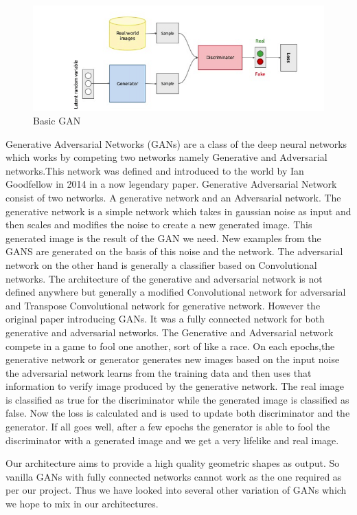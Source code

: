 \documentclass{article}
\begin{document}
\begin{figure}[H]
    \centering
    \includegraphics[width=15cm]{images/GAN/basicGAN.png}
    \caption{Basic GAN}
    \label{fig:my_label}
\end{figure}
Generative Adversarial Networks (GANs) are a class of the deep neural networks which works by competing two networks namely Generative and Adversarial networks.This network was defined and introduced to the world by Ian Goodfellow in 2014 in a now legendary paper. Generative Adversarial Network consist of two networks. A generative network and an Adversarial network. The generative network is a simple network which takes in gaussian noise as input and then scales and modifies the noise to create a new generated image. This generated image is the result of the GAN we need. New examples from the GANS are generated on the basis of this noise and the network. The adversarial network on the other hand is generally a classifier based on Convolutional networks. The architecture of the generative and adversarial network is not defined anywhere but generally a modified Convolutional network for adversarial and Transpose Convolutional network for generative network. However the original paper introducing GANs. It was a fully connected network for both generative and adversarial networks.
The Generative and Adversarial network compete in a game to fool one another, sort of like a race. On each epochs,the generative network or generator generates new images based on the input noise  the adversarial network learns from the training data and then uses that information to verify image produced by the generative network. The real image is classified as true for the discriminator while the generated image is classified as false. Now the loss is calculated and is used to update both discriminator and the generator. If all goes well, after a few epochs the generator is able to fool the discriminator with a generated image and we get a very lifelike and real image.
 
Our architecture aims to provide a high quality geometric shapes as output. So vanilla GANs with fully connected networks cannot work as the one required as per our project. Thus we have looked into several other variation of GANs which we hope to mix in our architectures.
\end{document}
